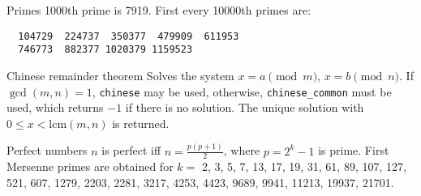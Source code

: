 \clearpage
{}
\categorycontents{}


\begin{algorithm}{Primes}
\desc
1000th prime is 7919. First every 10000th primes are: {\small
\begin{verbatim}
  104729  224737  350377  479909  611953
  746773  882377 1020379 1159523
\end{verbatim}
}\end{algorithm}





\begin{algorithm}{Chinese remainder theorem}
\desc
Solves the system $x = a \pmod m$, $x = b \pmod n$.  If $\gcd(m,n) =
1$, {\tt chinese} may be used, otherwise, {\tt chinese\_common} must be
used, which returns $-1$ if there is no solution.  The unique solution
with $0 \le x < \mathrm{lcm}(m, n)$ is returned.
\end{algorithm}


\begin{algorithm}{Perfect numbers}
\label{perfnum}
\desc
$n$ is perfect iff $n = \frac{p(p+1)}{2}$, where $p = 2^k-1$ is prime.
First Mersenne primes are obtained for $k =$ 2, 3, 5, 7, 13, 17, 19,
31, 61, 89, 107, 127, 521, 607, 1279, 2203, 2281, 3217, 4253, 4423,
9689, 9941, 11213, 19937, 21701.\\
\end{algorithm}

